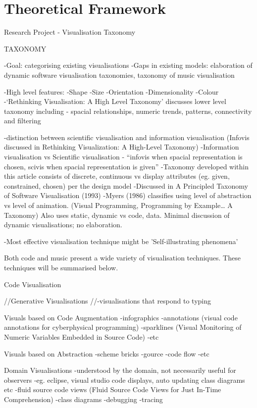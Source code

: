 \section{Theoretical Framework}
\label{sec:framework}

Research Project - Visualisation Taxonomy

TAXONOMY

-Goal: categorising existing visualisations
-Gaps in existing models: elaboration of dynamic software visualisation taxonomies, taxonomy of music visualisation

-High level features:
	-Shape
	-Size
	-Orientation
	-Dimensionality
	-Colour
-‘Rethinking Visualisation: A High Level Taxonomy' discusses lower level taxonomy including - spacial relationships, numeric trends, patterns, connectivity and filtering

-distinction between scientific visualisation and information visualisation (Infovis discussed in Rethinking Visualization: A High-Level Taxonomy)
-Information visualisation vs Scientific visualisation - “infovis when spacial representation is chosen, scivis when spacial representation is given”
-Taxonomy developed within this article consists of {discrete, continuous} vs display attributes (eg. given, constrained, chosen) per the design model
-Discussed in A Principled Taxonomy of Software Visualisation (1993)
-Myers (1986) classifies using level of abstraction vs level of animation. (Visual Programming, Programming by Example… A Taxonomy) Also uses {static, dynamic} vs {code, data}. Minimal discussion of dynamic visualisations; no elaboration.

-Most effective visualisation technique might be 'Self-illustrating phenomena'

Both code and music present a wide variety of visualisation techniques. These techniques will be summarised below.

Code Visualisation

//Generative Visualisations
//-visualisations that respond to typing

Visuals based on Code Augmentation
-infographics
-annotations (visual code annotations for cyberphysical programming)
-sparklines (Visual Monitoring of Numeric Variables Embedded in Source Code)
-etc

Visuals based on Abstraction
-scheme bricks
-gource
-code flow
-etc

Domain Visualisations
-understood by the domain, not necessarily useful for observers
-eg. eclipse, visual studio code displays, auto updating class diagrams etc
-fluid source code views (Fluid Source Code Views for Just In-Time Comprehension)
-class diagrams
-debugging
-tracing

